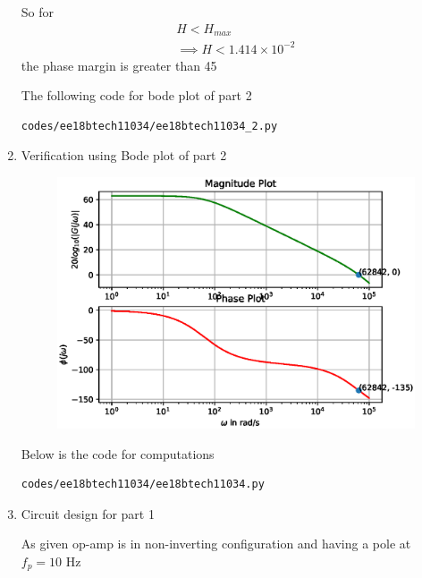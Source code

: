 \begin{enumerate}[label=\thesubsection.\arabic*.,ref=\thesubsection.\theenumi]
So for 
\begin{align}
    H < H_{max} 
    \\
    \implies H < 1.414 \times 10^{-2}
\end{align}
the phase margin is greater than 45\degree

The following code for bode plot of part 2
\begin{lstlisting}
codes/ee18btech11034/ee18btech11034_2.py
\end{lstlisting}

\item Verification using Bode plot of part 2
\begin{figure}[!h]
\centering
\includegraphics[width=\columnwidth]{./figs/ee18btech11034/ee18btech11034_2.eps}
\caption{}
\label{fig:ee18btech11034_2}
\end{figure}

Below is the code for computations
\begin{lstlisting}
codes/ee18btech11034/ee18btech11034.py
\end{lstlisting}

\item Circuit design for part 1

As given op-amp is in non-inverting configuration and having a pole at $f_{p} = 10$ Hz


\end{enumerate}
